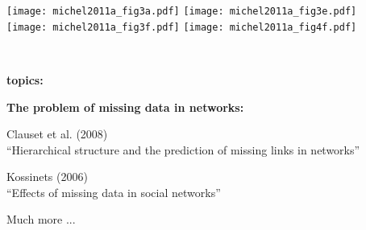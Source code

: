   \texttt{[image: michel2011a\_fig3a.pdf]} 
  \texttt{[image: michel2011a\_fig3e.pdf]} \\
  \texttt{[image: michel2011a\_fig3f.pdf]}
  \texttt{[image: michel2011a\_fig4f.pdf]}

  {\small
    \\
  }



  \textbf{topics:}

  \textbf{The problem of missing data in networks:}
    
     
      Clauset et al. (2008)\\
      ``Hierarchical structure and the prediction of missing links in networks''\cite{clauset2008a}
     
      Kossinets (2006)\\
      ``Effects of missing data in social networks''\cite{kossinets2006b}
     
      Much more ...
    
  





